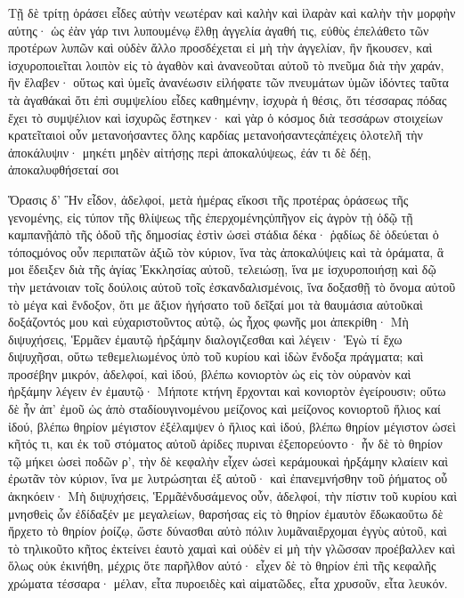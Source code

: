 Τῇ δὲ τρίτῃ ὁράσει εἶδες αὐτὴν νεωτέραν καὶ καλὴν καὶ ἱλαρὰν καὶ καλὴν τὴν μορφὴν αὐτης· ὡς ἐὰν γάρ τινι λυπουμένῳ ἔλθῃ ἀγγελία ἀγαθή τις, εὐθὺς ἐπελάθετο τῶν προτέρων λυπῶν καὶ οὐδὲν ἄλλο προσδέχεται εἰ μὴ τὴν ἀγγελίαν, ἣν ἤκουσεν, καὶ ἰσχυροποιεῖται λοιπὸν εἰς τὸ ἀγαθὸν καὶ ἀνανεοῦται αὐτοῦ τὸ πνεῦμα διὰ τὴν χαράν, ἣν ἔλαβεν· οὕτως καὶ ὑμεῖς ἀνανέωσιν εἰλήφατε τῶν πνευμάτων ὑμῶν ἰδόντες ταῦτα τὰ ἀγαθάκαὶ ὅτι ἐπὶ συμψελίου εἶδες καθημένην, ἰσχυρὰ ἡ θέσις, ὅτι τέσσαρας πόδας ἔχει τὸ συμψέλιον καὶ ἰσχυρῶς ἕστηκεν· καὶ γὰρ ὁ κόσμος διὰ τεσσάρων στοιχείων κρατεῖταιοἱ οὖν μετανοήσαντες ὅλης καρδίας μετανοήσαντεςἀπέχεις ὁλοτελῆ τὴν ἀποκάλυψιν· μηκέτι μηδὲν αἰτήσῃς περὶ ἀποκαλύψεως, ἐάν τι δὲ δέῃ, ἀποκαλυφθήσεταί σοι

Ὅρασις δ’
Ἣν εἶδον, ἀδελφοί, μετὰ ἡμέρας εἴκοσι τῆς προτέρας ὁράσεως τῆς γενομένης, εἰς τύπον τῆς θλίψεως τῆς ἐπερχομένηςὑπῆγον εἰς ἀγρὸν τῂ ὁδῷ τῇ καμπανῇἀπὸ τῆς ὁδοῦ τῆς δημοσίας ἐστὶν ὡσεὶ στάδια δέκα· ῥᾳδίως δὲ ὁδεύεται ὁ τόποςμόνος οὖν περιπατῶν ἀξιῶ τὸν κύριον, ἵνα τὰς ἀποκαλύψεις καὶ τὰ ὁράματα, ἃ μοι ἔδειξεν διὰ τῆς ἁγίας Ἐκκλησίας αὐτοῦ, τελειώσῃ, ἵνα με ἰσχυροποιήσῃ καὶ δῷ τὴν μετάνοιαν τοῖς δούλοις αὐτοῦ τοῖς ἐσκανδαλισμένοις, ἵνα δοξασθῇ τὸ ὄνομα αὐτοῦ τὸ μέγα καὶ ἔνδοξον, ὅτι με ἄξιον ἡγήσατο τοῦ δεῖξαί μοι τὰ θαυμάσια αὐτοῦκαὶ δοξάζοντός μου καὶ εὐχαριστοῦντος αὐτῷ, ὡς ἦχος φωνῆς μοι ἀπεκρίθη· Μὴ διψυχήσεις, Ἑρμᾶεν ἐμαυτῷ ἠρξάμην διαλογιζεσθαι καὶ λέγειν· Ἐγὼ τί ἔχω διψυχῆσαι, οὕτω τεθεμελιωμένος ὑπὸ τοῦ κυρίου καὶ ἰδὼν ἔνδοξα πράγματα; καὶ προσέβην μικρόν, ἀδελφοί, καὶ ἰδού, βλέπω κονιορτὸν ὡς εἰς τὸν οὐρανὸν καὶ ἠρξάμην λέγειν ἐν ἐμαυτῷ· Μήποτε κτήνη ἔρχονται καὶ κονιορτὸν ἐγείρουσιν; οὕτω δὲ ἦν ἀπ’ ἐμοῦ ὡς ἀπὸ σταδίουγινομένου μείζονος καὶ μείζονος κονιορτοῦ ἥλιος καί ἰδού, βλέπω θηρίον μέγιστον ἐξέλαμψεν ὁ ἥλιος καὶ ἰδού, βλέπω θηρίον μέγιστον ὡσεὶ κῆτός τι, και ἐκ τοῦ στόματος αὐτοῦ ἀρίδες πυριναι ἐξεπορεύοντο· ἦν δὲ τὸ θηρίον τῷ μήκει ὡσεὶ ποδῶν ρ’, τὴν δὲ κεφαλὴν εἶχεν ὡσεὶ κεράμουκαὶ ἠρξάμην κλαίειν καὶ ἐρωτᾶν τὸν κύριον, ἵνα με λυτρώσηται ἐξ αὐτοῦ· καὶ ἐπανεμνήσθην τοῦ ῥήματος οὗ ἀκηκόειν· Μὴ διψυχήσεις, Ἑρμᾶἐνδυσάμενος οὖν, ἀδελφοί, τὴν πίστιν τοῦ κυρίου καὶ μνησθεὶς ὧν ἐδίδαξέν με μεγαλείων, θαρσήσας εἰς τὸ θηρίον ἐμαυτὸν ἔδωκαοὕτω δὲ ἤρχετο τὸ θηρίον ῥοίζῳ, ὥστε δύνασθαι αὐτὸ πόλιν λυμᾶναιἔρχομαι ἐγγὺς αὐτοῦ, καὶ τὸ τηλικοῦτο κῆτος ἐκτείνει ἑαυτὸ χαμαὶ καὶ οὐδὲν εἰ μὴ τὴν γλῶσσαν προέβαλλεν καὶ ὅλως οὐκ ἐκινήθη, μέχρις ὅτε παρῆλθον αὐτό· εἶχεν δὲ τὸ θηρίον ἐπὶ τῆς κεφαλῆς χρώματα τέσσαρα· μέλαν, εἶτα πυροειδὲς καὶ αἱματῶδες, εἶτα χρυσοῦν, εἶτα λευκόν.
